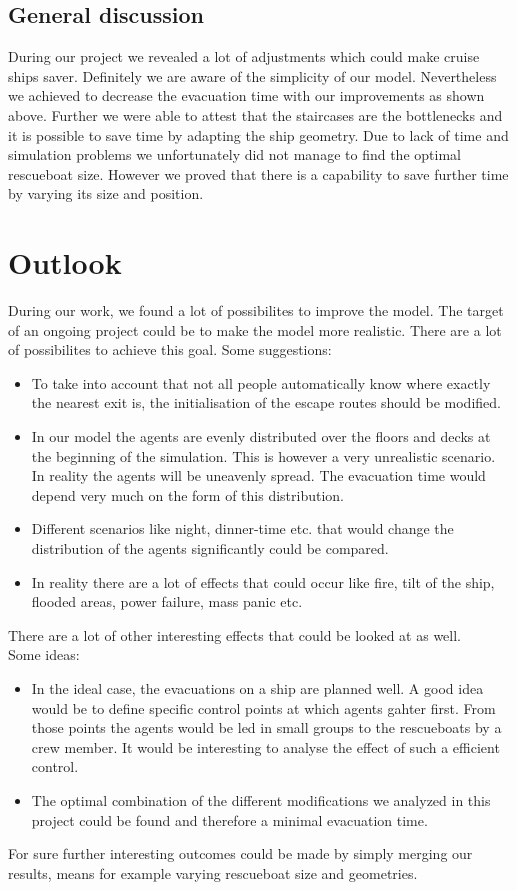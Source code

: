 \documentclass[11pt]{article}
\begin{document}
\subsection{General discussion}

During our project we revealed a lot of adjustments which could make cruise ships saver. Definitely we are aware of the simplicity of our model. Nevertheless we achieved to decrease the evacuation time with our improvements as shown above. Further we were able to attest that the staircases are the bottlenecks and it is possible to save time by adapting the ship geometry. Due to lack of time and simulation problems we unfortunately did not manage to find the optimal rescueboat size. However we proved that there is a capability to save further time by varying its size and position.


\section{Outlook}
During our work, we found a lot of possibilites to improve the model. The target of an ongoing project could be to make the model more realistic. There are a lot of possibilites to achieve this goal.
\newline
Some suggestions:
\begin{itemize}
\item To take into account that not all people automatically know where exactly the nearest exit is, the initialisation of the escape routes should be modified.
\item In our model the agents are evenly distributed over the floors and decks at the beginning of the simulation. This is however a very unrealistic scenario. In reality the agents will be uneavenly spread. The evacuation time would depend very much on the form of this distribution.
\item Different scenarios like night, dinner-time etc. that would change the distribution of the agents significantly could be compared.
\item In reality there are a lot of effects that could occur like fire, tilt of the ship, flooded areas, power failure, mass panic etc.
\end{itemize}
There are a lot of other interesting effects that could be looked at as well.
\\
Some ideas:
\begin{itemize}
\item In the ideal case, the evacuations on a ship are planned well. A good idea would be to define specific control points at which agents gahter first. From those points the agents would be led in small groups to the rescueboats by a crew member. It would be interesting to analyse the effect of such a efficient control.
\item The optimal combination of the different modifications we analyzed in this project could be found and therefore a minimal evacuation time.
\end{itemize}
For sure further interesting outcomes could be made by simply merging our results, means for example varying rescueboat size and geometries.
\end{document}
